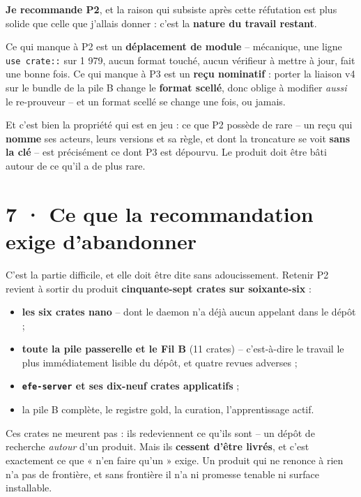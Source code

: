 \documentclass[10pt]{article}
\newcommand{\code}[1]{\texttt{\small #1}}
\begin{document}
\begin{piste}
\textbf{Je recommande P2}, et la raison qui subsiste après cette réfutation est plus solide que celle
que j'allais donner : c'est la \textbf{nature du travail restant}.

Ce qui manque à P2 est un \textbf{déplacement de module} -- mécanique, une ligne \code{use crate::} sur
1 979, aucun format touché, aucun vérifieur à mettre à jour, fait une bonne fois. Ce qui manque à P3
est un \textbf{reçu nominatif} : porter la liaison v4 sur le bundle de la pile B change le
\textbf{format scellé}, donc oblige à modifier \emph{aussi} le re-prouveur -- et un format scellé se
change une fois, ou jamais.

Et c'est bien la propriété qui est en jeu : ce que P2 possède de rare -- un reçu qui \textbf{nomme} ses
acteurs, leurs versions et sa règle, et dont la troncature se voit \textbf{sans la clé} -- est
précisément ce dont P3 est dépourvu. Le produit doit être bâti autour de ce qu'il a de plus rare.
\end{piste}

\section{7 · Ce que la recommandation exige d'abandonner}

C'est la partie difficile, et elle doit être dite sans adoucissement. Retenir P2 revient à sortir du
produit \textbf{cinquante-sept crates sur soixante-six} :

\begin{itemize}[leftmargin=1.1em,itemsep=1pt,topsep=2pt]
\item \textbf{les six crates nano} -- dont le daemon n'a déjà aucun appelant dans le dépôt ;
\item \textbf{toute la pile passerelle et le Fil B} (11 crates) -- c'est-à-dire le travail le plus
      immédiatement lisible du dépôt, et quatre revues adverses ;
\item \textbf{\code{efe-server} et ses dix-neuf crates applicatifs} ;
\item la pile B complète, le registre gold, la curation, l'apprentissage actif.
\end{itemize}

Ces crates ne meurent pas : ils redeviennent ce qu'ils sont -- un dépôt de recherche \emph{autour} d'un
produit. Mais ils \textbf{cessent d'être livrés}, et c'est exactement ce que « n'en faire qu'un »
exige. Un produit qui ne renonce à rien n'a pas de frontière, et sans frontière il n'a ni promesse
tenable ni surface installable.
\end{document}
